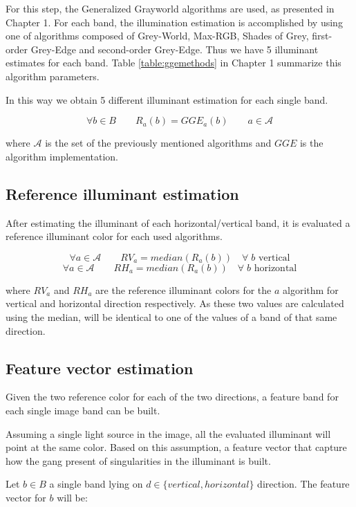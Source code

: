 For this step, the Generalized Grayworld \cite{van2007edge} algorithms are used, as presented in Chapter 1. For each band, the illumination estimation is accomplished by using one of algorithms composed of Grey-World, Max-RGB, Shades of Grey, first-order Grey-Edge and second-order Grey-Edge. Thus we have 5 illuminant estimates for each band.
Table \ref{table:ggemethods} in Chapter 1 summarize this algorithm parameters.

In this way we obtain 5 different illuminant estimation for each single band.

$$
\forall b \in B \qquad R_a(b) = GGE_a(b) \qquad a \in \mathcal{A}
$$

where $\mathcal{A}$ is the set of the previously mentioned algorithms and $GGE$ is the algorithm implementation.

\subsection{Reference illuminant estimation}

After estimating the illuminant of each horizontal/vertical band, it is evaluated a reference illuminant color for each used algorithms.

$$
\forall a \in \mathcal{A} \qquad RV_a = median(R_a(b)) \quad \forall \; b \textrm{ vertical}
$$
$$
\forall a \in \mathcal{A} \qquad RH_a = median(R_a(b)) \quad \forall \; b \textrm{ horizontal}
$$

where $RV_a$ and $RH_a$ are the reference illuminant colors for the $a$ algorithm for vertical and horizontal direction respectively. As these two values are calculated using the median, will be identical to one of the values of a band of that same direction.

\subsection{Feature vector estimation}

Given the two reference color for each of the two directions, a feature band for each single image band can be built.

Assuming a single light source in the image, all the evaluated illuminant will point at the same color.
Based on this assumption, a feature vector that capture how the gang present of singularities in the illuminant is built.

Let $b \in B$ a single band lying on $d \in \{vertical, horizontal\}$ direction. The feature vector for $b$ will be:

